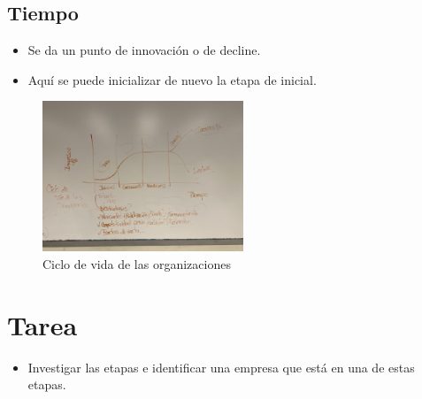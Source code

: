 \subsection{Tiempo}
\begin{itemize}
    \item Se da un punto de innovación o de decline.
    \item Aquí se puede inicializar de nuevo la etapa de inicial.
\end{itemize}



\begin{figure}[htbp]
    \centering
    \includegraphics[width=6cm]{./../__Imagenes__/2020-01-15-CicloDeVidaOrganizacion.jpeg}
    \caption{Ciclo de vida de las organizaciones}
    \label{}
\end{figure} 


\section*{Tarea}
\begin{itemize}
    \item Investigar las etapas e identificar una empresa que está en una de estas etapas.
\end{itemize}   
